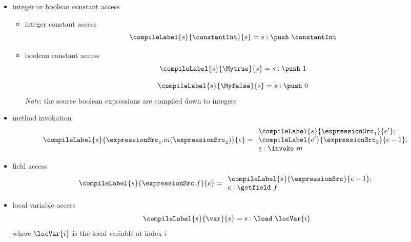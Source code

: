 \begin{itemize}
  \item  integer or boolean constant access 
     \begin{itemize}
            \item  integer constant access 
	         $$\compileLabel{s}{\constantInt}{s} = s : \push \  \constantInt $$
	    \item boolean constant access
	          $$\compileLabel{s}{\Mytrue}{s} = s: \push  \ 1 $$
                   
                  $$\compileLabel{s}{\Myfalse}{s} = s: \push \ 0 $$
		  \textit{Note}: the source boolean expressions are compiled down to integers 
     \end{itemize}
  \item  method invokation
     $$\compileLabel{s}{ \expressionSrc_1.m(\expressionSrc_2)}{e} = 
           \begin{array}{l}  
                 \compileLabel{s}{\expressionSrc_1}{e'};\\
		 \compileLabel{e'}{\expressionSrc_2}{e - 1};\\
		  e  :\invoke \ m
            \end{array}     
    $$
  




\item field access
     $$\compileLabel{s}{ \expressionSrc.f}{e} =   
         \begin{array}{l}
              \compileLabel{s}{\expressionSrc}{e - 1}; \\ 
              e : \getfield  \ f
           \end{array}   
     $$ 



  
   \item local variable access
     $$\compileLabel{s}{ \var }{s} =  s: \load \ \locVar{i} $$ 
   where $\locVar{i} $ is the local variable at index $i$



\end{itemize}
